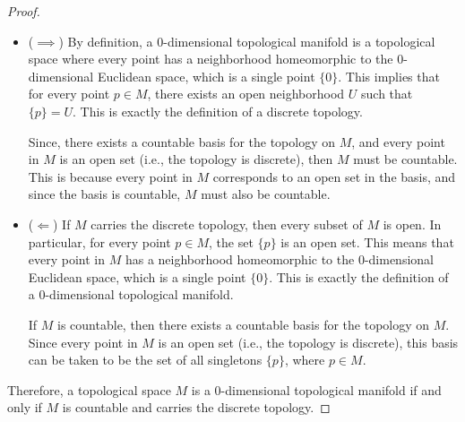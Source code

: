 \documentclass[
]{book}
\theoremstyle{definition}
\theoremstyle{definition}
\theoremstyle{definition}
\theoremstyle{definition}
\theoremstyle{remark}
\begin{document}
\begin{proof}
\leavevmode

\begin{itemize}
\item
  (\(\implies\)) By definition, a 0-dimensional topological manifold is a topological space where every point has a neighborhood homeomorphic to the 0-dimensional Euclidean space, which is a single point \(\{0\}\). This implies that for every point \(p \in M\), there exists an open neighborhood \(U\) such that \(\{p\} = U\). This is exactly the definition of a discrete topology.

  Since, there exists a countable basis for the topology on \(M\), and every point in \(M\) is an open set (i.e., the topology is discrete), then \(M\) must be countable. This is because every point in \(M\) corresponds to an open set in the basis, and since the basis is countable, \(M\) must also be countable.
\item
  (\(\Longleftarrow\)) If \(M\) carries the discrete topology, then every subset of \(M\) is open. In particular, for every point \(p \in M\), the set \(\{p\}\) is an open set. This means that every point in \(M\) has a neighborhood homeomorphic to the 0-dimensional Euclidean space, which is a single point \(\{0\}\). This is exactly the definition of a 0-dimensional topological manifold.

  If \(M\) is countable, then there exists a countable basis for the topology on \(M\). Since every point in \(M\) is an open set (i.e., the topology is discrete), this basis can be taken to be the set of all singletons \(\{p\}\), where \(p \in M\).
\end{itemize}

Therefore, a topological space \(M\) is a 0-dimensional topological manifold if and only if \(M\) is countable and carries the discrete topology.

\end{proof}

  
\end{document}
